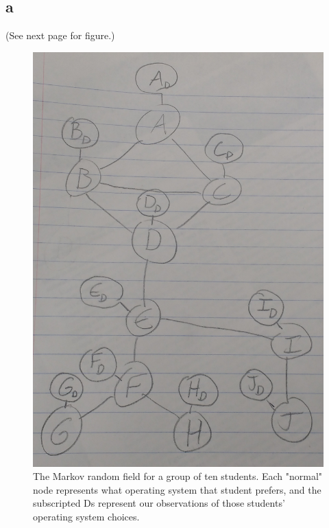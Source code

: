 \documentclass{article}
\begin{document}
\subsection{a}

(See next page for figure.)

\begin{figure}[!ht]
	\centering
	\includegraphics[width=120mm]{figs/friendship-mrf.jpg}
	\caption{The Markov random field for a group of ten students.
        Each "normal" node represents what operating system that student 
        prefers, and the subscripted Ds represent our observations 
        of those students' operating system choices.}
\end{figure}
\end{document}
